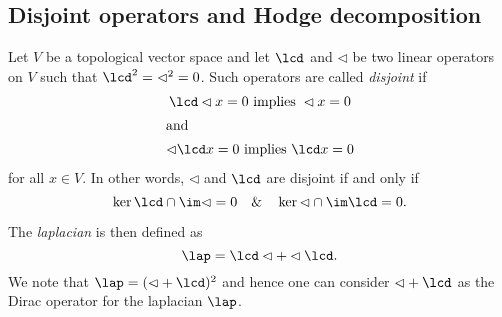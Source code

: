 \subsection{Disjoint operators and Hodge decomposition}

Let $V$ be a topological vector space and let $\lcd$ and $\lhd$ be two linear operators on $V$ such that $\lcd^2 = \lhd^2 = 0$. Such operators are called \emph{disjoint} if
\begin{gather*}
 \lcd\lhd x= 0 \text{ implies } \lhd x =0 \\
 \intertext{and}
 \lhd \lcd x = 0 \text{ implies } \lcd x = 0
\end{gather*}
for all $x\in V$. In other words, $\lhd$ and $\lcd$ are disjoint if and only if
\begin{equation}\label{eq:disjointness}
 \ker \lcd \cap \im \lhd = 0 \quad \& \quad \ker \lhd \cap \im \lcd = 0.
\end{equation}


The \emph{laplacian} is then defined as
\[\lap = \lcd \lhd + \lhd \lcd.\] We note that $\lap  = (\lhd + \lcd)^2$ and hence one can consider $\lhd + \lcd$ as the Dirac operator for the laplacian $\lap$. %

